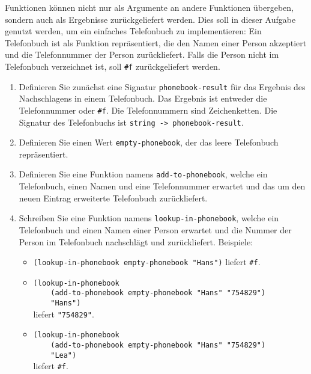 \begin{aufgabe}
  Funktionen können nicht nur als Argumente an
  andere Funktionen übergeben, sondern auch als Ergebnisse
  zurückgeliefert werden. Dies soll in dieser Aufgabe genutzt werden,
  um ein einfaches Telefonbuch zu implementieren: Ein Telefonbuch ist
  als Funktion repräsentiert, die den Namen einer Person akzeptiert
  und die Telefonnummer der Person zurückliefert. Falls die Person
  nicht im Telefonbuch verzeichnet ist, soll \verb|#f| zurückgeliefert
  werden.

  \begin{enumerate}
  \item Definieren Sie zunächst eine Signatur
    \verb"phonebook-result" für das Ergebnis des Nachschlagens in einem
    Telefonbuch. Das Ergebnis ist entweder die Telefonnummer oder
    \verb|#f|. Die Telefonnummern sind Zeichenketten.
    Die Signatur des Telefonbuchs ist  \verb"string -> phonebook-result".
  \item Definieren Sie einen Wert \verb"empty-phonebook", der das leere
    Telefonbuch repräsentiert.
  \item Definieren Sie eine Funktion namens
    \verb"add-to-phonebook", welche ein Telefonbuch, einen Namen
    und eine Telefonnummer erwartet und das um den neuen Eintrag
    erweiterte
    Telefonbuch zurückliefert.
  \item Schreiben Sie eine Funktion namens \verb"lookup-in-phonebook",
    welche ein Telefonbuch und einen Namen einer Person erwartet und die
    Nummer der Person im Telefonbuch nachschlägt und zurückliefert.
    Beispiele:
    \begin{itemize}
    \item \verb|(lookup-in-phonebook empty-phonebook "Hans")| liefert
      \verb|#f|.
    \item \verb|(lookup-in-phonebook| \\
      \verb|    (add-to-phonebook empty-phonebook "Hans" "754829")|\\
      \verb|    "Hans")| \\
      liefert \verb|"754829"|.
    \item \verb|(lookup-in-phonebook|\\
      \verb|    (add-to-phonebook empty-phonebook "Hans" "754829")|\\
      \verb|    "Lea")|\\
      liefert \verb|#f|.
    \end{itemize}
  \end{enumerate}
\end{aufgabe}

